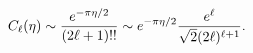 \[\mathop{C_{\ell}\/}\nolimits\!\left(\eta\right)\sim\dfrac{e^{-\pi\eta/2}}{(2%
\ell+1)!!}\sim e^{-\pi\eta/2}\dfrac{e^{\ell}}{\sqrt{2}(2\ell)^{\ell+1}}.\]